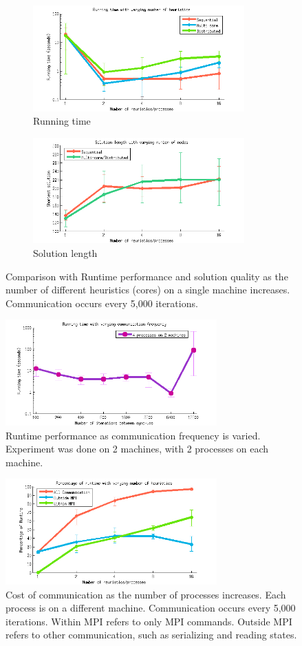 \documentclass[11pt]{article}
\begin{document}
{\begin{figure}
\centering
\begin{subfigure}{3.2in}
  \includegraphics[width=3.2in]{graphs/figure1}
  \caption{Running time}
  \label{fig1}
\end{subfigure}
\begin{subfigure}{3.2in}
  \includegraphics[width=3.2in]{graphs/figure2}
  \caption{Solution length}
  \label{fig2}
\end{subfigure}
\caption{Comparison with Runtime performance and solution quality as the number of different heuristics (cores) on a single machine increases. Communication occurs every 5,000 iterations.}
\label{fig:singthread}
\end{figure}

\begin{figure}
\centering
\includegraphics[width=3.2in]{graphs/figure3}
\caption{Runtime performance as communication frequency is varied. Experiment was done on 2 machines, with 2 processes on each machine.}
\label{fig3}
\end{figure}

\begin{figure}
\centering
\includegraphics[width=3.2in]{graphs/figure5}
\caption{Cost of communication as the number of processes increases. Each process is on a different machine. Communication occurs every 5,000 iterations. Within MPI refers to only MPI commands. Outside MPI refers to other communication, such as serializing and reading states.}
\label{fig5}
\end{figure}

}
\end{document}
